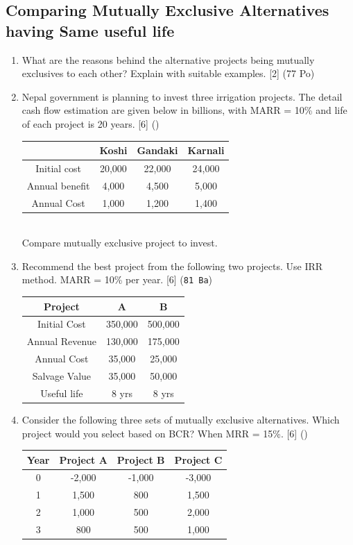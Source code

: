 \documentclass[12pt]{article}
\begin{document}
	\subsection{Comparing Mutually Exclusive Alternatives having Same useful life}
		\begin{enumerate}
			\item What are the reasons behind the alternative projects being mutually exclusives to each other? Explain with suitable examples. \hfill [2] (77 Po)
			
			\item Nepal government is planning to invest three irrigation projects. The detail cash flow estimation are given below in billions, with MARR = 10\% and life of each project is 20 years. \hfill [6] ()
			\begin{tabular}{|c|c|c|c|}
				\hline
				& Koshi & Gandaki & Karnali \\ \hline
				Initial cost & 20,000 & 22,000 & 24,000 \\ \hline
				Annual benefit & 4,000 & 4,500 & 5,000 \\ \hline
				Annual Cost & 1,000 & 1,200 & 1,400 \\ \hline
			\end{tabular}\\
			Compare mutually exclusive project to invest.

			\item Recommend the best project from the following two projects. Use IRR method. MARR = 10\% per year. \hfill [6] (\texttt{81 Ba})\\
			\begin{tabular}{|c|c|c|}
				\hline
				Project & A & B \\ \hline
				Initial Cost & 350,000 & 500,000 \\ \hline
				Annual Revenue & 130,000 & 175,000 \\ \hline
				Annual Cost & 35,000 & 25,000 \\ \hline
				Salvage Value & 35,000 & 50,000 \\ \hline
				Useful life & 8 yrs & 8 yrs \\ \hline
			\end{tabular}
			
			\item Consider the following three sets of mutually exclusive alternatives. Which project would you select based on BCR? When MRR = 15\%. \hfill [6] ()\\
			\begin{tabular}{|c|c|c|c|}
				\hline
				Year & Project A & Project B & Project C \\ \hline
				0 & -2,000 & -1,000 & -3,000 \\ \hline
				1 & 1,500 & 800 & 1,500 \\ \hline
				2 & 1,000 & 500 & 2,000 \\ \hline
				3 & 800 & 500 & 1,000 \\ \hline
			\end{tabular}
			

\end{enumerate}
\end{document}
